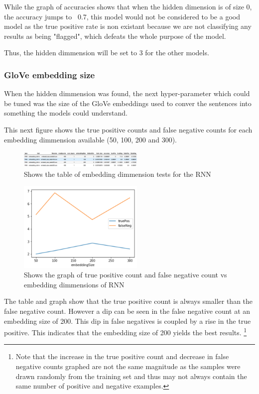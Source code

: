 \documentclass[twoside,twocolumn]{article}
\begin{document}
While the graph of accuracies shows that when the hidden dimension is of size 0, the accuracy jumps
to ~0.7, this model would not be considered to be a good model as the true positive rate is non existant
because we are not classifying any results as being "flagged", which defeats the whole purpose of the model.

Thus, the hidden dimmension will be set to 3 for the other models.

\subsubsection{GloVe embedding size}

When the hidden dimmension was found, the next hyper-parameter which could be tuned was the size
of the GloVe embeddings used to conver the sentences into something the models could understand.

This next figure shows the true positive counts and false negative counts for each embedding dimmension
available (50, 100, 200 and 300).

\begin{figure}[H]
\includegraphics[width=6cm]{rnn_embeddSize_test_table}
\centering
\caption{Shows the table of embedding dimmension tests for the RNN}
\end{figure}

\begin{figure}[H]
\includegraphics[width=6cm]{rnn_embeddSize_test_graph}
\centering
\caption{Shows the graph of true positive count and false negative count vs embedding dimmensions of RNN}
\end{figure}

The table and graph show that the true positive count is always smaller than the false negative count.
However a dip can be seen in the false negative count at an embedding size of 200. This dip in
false negatives is coupled by a rise in the true positive. This indicates that the embedding size of 200
yields the best results. \footnote{Note that the increase in the true positive count and decrease in false
negative counts graphed are not the same magnitude as the samples were drawn randomly from the training
set and thus may not always contain the same number of positive and negative examples.}
\end{document}
